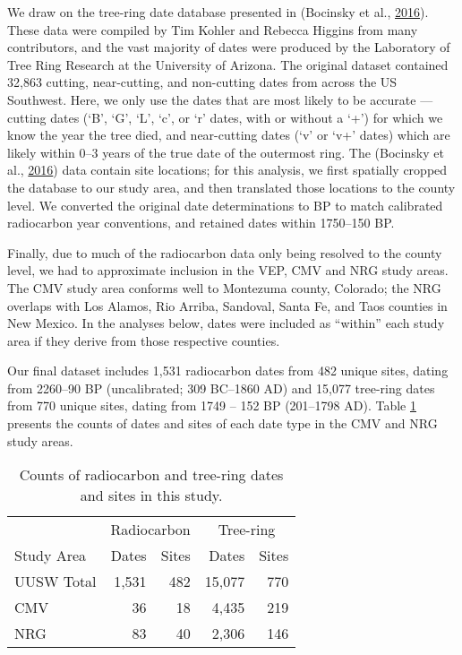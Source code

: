 \documentclass[
]{sa}
\begin{document}
We draw on the tree-ring date database presented in (Bocinsky et al., \protect\hyperlink{ref-Bocinsky2016}{2016}). These data were compiled by Tim Kohler and Rebecca Higgins from many contributors, and the vast majority of dates were produced by the Laboratory of Tree Ring Research at the University of Arizona. The original dataset contained 32,863 cutting, near-cutting, and non-cutting dates from across the US Southwest. Here, we only use the dates that are most likely to be accurate --- cutting dates (`B', `G', `L', `c', or `r' dates, with or without a `+') for which we know the year the tree died, and near-cutting dates (`v' or `v+' dates) which are likely within 0--3 years of the true date of the outermost ring. The (Bocinsky et al., \protect\hyperlink{ref-Bocinsky2016}{2016}) data contain site locations; for this analysis, we first spatially cropped the database to our study area, and then translated those locations to the county level. We converted the original date determinations to BP to match calibrated radiocarbon year conventions, and retained dates within 1750--150 BP.

Finally, due to much of the radiocarbon data only being resolved to the county level, we had to approximate inclusion in the VEP, CMV and NRG study areas. The CMV study area conforms well to Montezuma county, Colorado; the NRG overlaps with Los Alamos, Rio Arriba, Sandoval, Santa Fe, and Taos counties in New Mexico. In the analyses below, dates were included as ``within'' each study area if they derive from those respective counties.

Our final dataset includes 1,531 radiocarbon dates from 482 unique sites, dating from 2260--90 BP (uncalibrated; 309 BC--1860 AD) and 15,077 tree-ring dates from 770 unique sites, dating from 1749 -- 152 BP (201--1798 AD). Table \ref{tab:Table1} presents the counts of dates and sites of each date type in the CMV and NRG study areas.

\begin{table}

\caption{\label{tab:Table1}Counts of radiocarbon and tree-ring dates and sites in this study.}
\centering
\begin{tabular}[t]{lrrrr}
\toprule
\multicolumn{1}{c}{ } & \multicolumn{2}{c}{Radiocarbon} & \multicolumn{2}{c}{Tree-ring} \\
\cmidrule(l{3pt}r{3pt}){2-3} \cmidrule(l{3pt}r{3pt}){4-5}
Study Area & Dates & Sites & Dates & Sites\\
\midrule
UUSW Total & 1,531 & 482 & 15,077 & 770\\
CMV & 36 & 18 & 4,435 & 219\\
NRG & 83 & 40 & 2,306 & 146\\
\bottomrule
\end{tabular}
\end{table}
\end{document}
